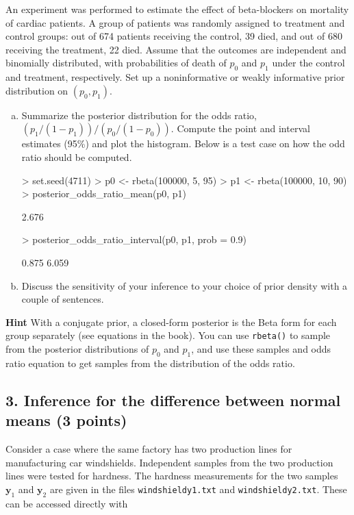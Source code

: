 \documentclass[a4paper,11pt]{article}
\begin{document}

An experiment was performed to estimate the effect of beta-blockers
on mortality of cardiac patients. A group of patients was randomly
assigned to treatment and control groups: out of 674 patients
receiving the control, 39 died, and out of 680 receiving the
treatment, 22 died. Assume that the outcomes are independent and
binomially distributed, with probabilities of death of $p_0$ and $p_1$
under the control and treatment, respectively. Set up a noninformative
or weakly informative prior distribution on $(p_0,p_1)$. 
\begin{enumerate}[a)]
\item Summarize the posterior distribution for the odds ratio, $(p_1/(1-p_1))/(p_0/(1-p_0))$. Compute the point and interval estimates (95\%) and plot the histogram. Below is a test case on how the odd ratio should be computed.
\begin{Schunk}
\begin{Sinput}
> set.seed(4711)
> p0 <- rbeta(100000, 5, 95)
> p1 <- rbeta(100000, 10, 90)
> posterior_odds_ratio_mean(p0, p1)
\end{Sinput}
\begin{Soutput}
[1] 2.676
\end{Soutput}
\begin{Sinput}
> posterior_odds_ratio_interval(p0, p1, prob = 0.9)
\end{Sinput}
\begin{Soutput}
[1] 0.875 6.059
\end{Soutput}
\end{Schunk}
\item Discuss the sensitivity of your inference
to your choice of prior density with a couple of sentences.
\end{enumerate}
\textbf{Hint} With a conjugate prior, a closed-form posterior is the Beta form for each group separately (see equations in the book). You can use {\tt rbeta()} to sample from the posterior distributions of $p_0$ and $p_1$, and use these samples and odds ratio equation to get samples from the distribution of the odds ratio.

\subsection*{3. Inference for the difference between normal means (3 points)}

Consider a case where the same factory has two production lines for
manufacturing car windshields. Independent samples from the two
production lines were tested for hardness. The hardness measurements
for the two samples $\mathbf{y}_1$ and $\mathbf{y}_2$ are given in the files {\tt windshieldy1.txt} and {\tt windshieldy2.txt}. These can be accessed directly with
\end{document}
